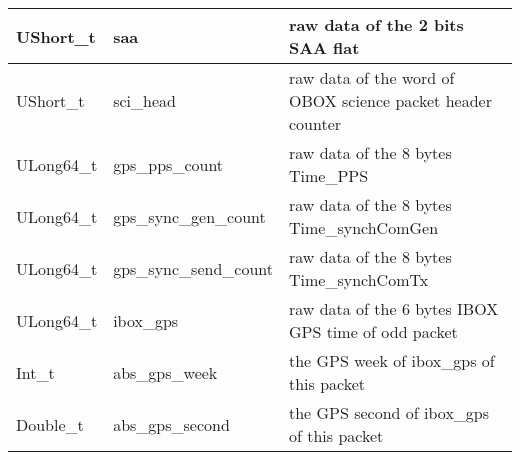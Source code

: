 \documentclass[a4paper, 12pt, onecolumn]{article}
\begin{document}
\begin{center}
\begin{supertabular}{| p{18mm} | p{38mm} | p{66mm} |}
    UShort\_t   & saa                      & raw data of the 2 bits SAA flat \\\hline
    UShort\_t   & sci\_head                & raw data of the word of OBOX science packet header counter \\\hline
    ULong64\_t  & gps\_pps\_count          & raw data of the 8 bytes Time\_PPS \\\hline
    ULong64\_t  & gps\_sync\_gen\_count    & raw data of the 8 bytes Time\_synchComGen \\\hline
    ULong64\_t  & gps\_sync\_send\_count   & raw data of the 8 bytes Time\_synchComTx \\\hline
    ULong64\_t  & ibox\_gps                & raw data of the 6 bytes IBOX GPS time of odd packet \\\hline
    Int\_t      & abs\_gps\_week           & the GPS week of ibox\_gps of this packet \\\hline
    Double\_t   & abs\_gps\_second         & the GPS second of ibox\_gps of this packet \\ 
  \end{supertabular}
\end{center}
\end{document}
